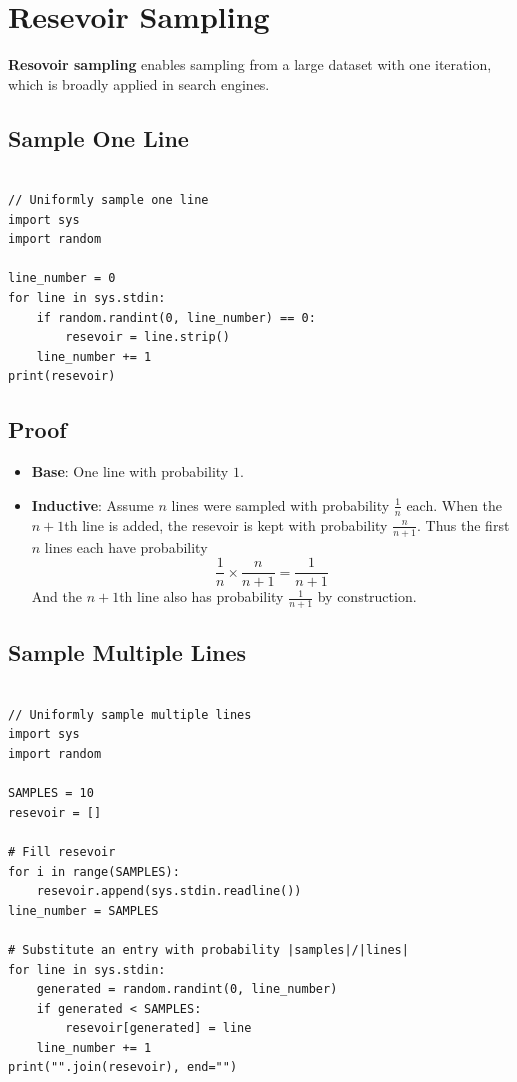 \documentclass[a4paper, 12pt]{book} %
\begin{document}
\section{Resevoir Sampling}
\textbf{Resovoir sampling} enables sampling from a large dataset with one iteration, which is broadly applied in search engines.

\subsection{Sample One Line}
\begin{lstlisting}

// Uniformly sample one line
import sys
import random

line_number = 0
for line in sys.stdin:
	if random.randint(0, line_number) == 0:
		resevoir = line.strip()
	line_number += 1
print(resevoir)
\end{lstlisting}

\subsection{Proof}
\begin{itemize}
	\item \textbf{Base}: One line with probability $1$.
	\item \textbf{Inductive}: Assume $n$ lines were sampled with probability $\frac{1}{n}$ each.
	When the $n + 1$th line is added, the resevoir is kept with probability $\frac{n}{n+1}$. Thus the first $n$ lines each have probability 
	$$\frac{1}{n} \times \frac{n}{n+1}=\frac{1}{n+1}$$
	And the $n+1$th line also has probability $\frac{1}{n+1}$ by construction.
\end{itemize}

\subsection{Sample Multiple Lines}
\begin{lstlisting}

// Uniformly sample multiple lines
import sys
import random

SAMPLES = 10
resevoir = []

# Fill resevoir
for i in range(SAMPLES):
	resevoir.append(sys.stdin.readline())
line_number = SAMPLES

# Substitute an entry with probability |samples|/|lines|
for line in sys.stdin:
	generated = random.randint(0, line_number)
	if generated < SAMPLES:
		resevoir[generated] = line
	line_number += 1
print("".join(resevoir), end="")
\end{lstlisting}
\end{document}

